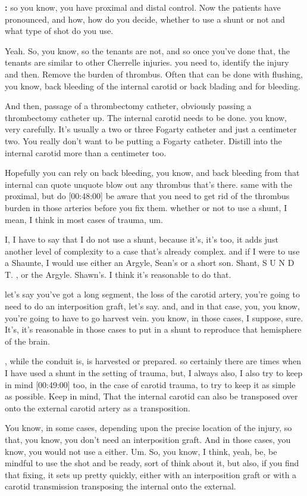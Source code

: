 \documentclass[
]{book}
\begin{document}
\textbf{:} so you know, you
have proximal and distal control. Now the patients have pronounced,
and how, how do you decide, whether to use a shunt or not and what
type of shot do you use.

Yeah. So,
you know, so the tenants are not, and so once you've done that, the
tenants are similar to other Cherrelle injuries. you need to,
identify the injury and then. Remove the burden of thrombus. Often that
can be done with flushing, you know, back bleeding of the internal
carotid or back blading and for bleeding.

And then, passage of a thrombectomy catheter, obviously passing a
thrombectomy catheter up. The internal carotid needs to be done. you
know, very carefully. It's usually a two or three Fogarty catheter and
just a centimeter two. You really don't want to be putting a Fogarty
catheter. Distill into the internal carotid more than a centimeter too.

Hopefully you can rely on back bleeding, you know, and back bleeding
from that internal can quote unquote blow out any thrombus that's there.
same with the proximal, but do {[}00:48:00{]} be aware that you need to
get rid of the thrombus burden in those arteries before you fix them.
whether or not to use a shunt, I mean, I think in most cases of
trauma, um.

I, I have to say that I do not use a shunt, because it's, it's too,
it adds just another level of complexity to a case that's already
complex. and if I were to use a Shaunte, I would use either an
Argyle, Sean's or a short son. Shant, S U N D T. , or the Argyle.
Shawn's. I think it's reasonable to do that.

let's say you've got a long segment, the loss of the carotid
artery, you're going to need to do an interposition graft, let's say.
and, and in that case, you, you know, you're going to have to go
harvest vein. you know, in those cases, I suppose, sure. It's,
it's reasonable in those cases to put in a shunt to reproduce that
hemisphere of the brain.

, while the conduit is, is harvested or prepared. so certainly there
are times when I have used a shunt in the setting of trauma, but, I
always also, I also try to keep in mind {[}00:49:00{]} too, in the case of
carotid trauma, to try to keep it as simple as possible. Keep in mind,
That the internal carotid can also be transposed over onto the
external carotid artery as a transposition.

You know, in some cases, depending upon the precise location of the
injury, so that, you know, you don't need an interposition graft. And in
those cases, you know, you would not use a either. Um. So, you know, I
think, yeah, be, be mindful to use the shot and be ready, sort of think
about it, but also, if you find that fixing, it sets up pretty
quickly, either with an interposition graft or with a carotid
transmission transposing the internal onto the external.
\end{document}
